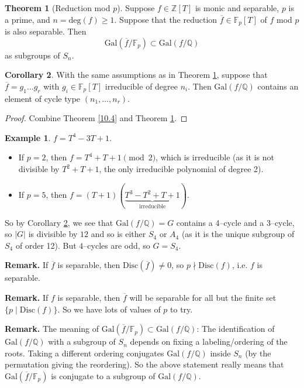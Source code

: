 \documentclass{article}
\theoremstyle{definition}
\newtheorem{theorem}{Theorem}[section]
\newtheorem{cor}[theorem]{Corollary}
\newtheorem{example}{Example}[section]
\begin{document}
\begin{theorem}[Reduction mod $p$]\label{10.5}
    Suppose $f \in \mathbb{Z}[T]$ is monic and separable, $p$ is a prime, and $n = \text{deg}(f)\ge 1$. Suppose that the reduction $\overline{f} \in \mathbb{F}_p[T]$ of $f$ mod $p$ is also separable. Then
    \[
    \text{Gal}(\overline{f}/\mathbb{F}_p) \subset \text{Gal}(f/\mathbb{Q})
    \]
    as subgroups of $S_n$.
\end{theorem}
\begin{cor}\label{10.6}
    With the same assumptions as in Theorem \ref{10.5}, suppose that $\overline{f}=g_1\ldots g_r$ with $g_i \in \mathbb{F}_p[T]$ irreducible of degree $n_i$. Then $\text{Gal}(f/\mathbb{Q})$ contains an element of cycle type $(n_1,\ldots,n_r)$.
\end{cor}
\begin{proof}
    Combine Theorem \ref{10.4} and Theorem \ref{10.5}.
\end{proof}
\begin{example}
    $f = T^4 - 3T + 1$.
    \begin{itemize}
        \item If $p=2$, then $f = T^4+T+1 \pmod{2}$, which is irreducible (as it is not divisible by $T^2+T+1$, the only irreducible polynomial of degree 2).
        \item If $p=5$, then $f=(T+1)(\underbrace{T^3-T^2+T+1}_{\text{irreducible}})$.
    \end{itemize}
    So by Corollary \ref{10.6}, we see that $\text{Gal}(f/\mathbb{Q})=G$ contains a 4--cycle and a 3--cycle, so $|G|$ is divisible by $12$ and so is either $S_4$ or $A_4$ (as it is the unique subgroup of $S_4$ of order 12). But $4$--cycles are odd, so $G = S_4$.
\end{example}
\textbf{Remark.} If $\overline{f}$ is separable, then $\text{Disc}(\overline{f}) \neq 0$, so $p \nmid \text{Disc}(f)$, i.e. $f$ is separable.
\vspace{1mm}


\textbf{Remark.} If $f$ is separable, then $\overline{f}$ will be separable for all but the finite set $\{p \mid \text{Disc}(f)\}$. So we have lots of values of $p$ to try.
\vspace{1mm}


\textbf{Remark.} The meaning of $\text{Gal}(\overline{f}/\mathbb{F}_p) \subset \text{Gal}(f/\mathbb{Q})$: The identification of $\text{Gal}(f/\mathbb{Q})$ with a subgroup of $S_n$ depends on fixing a labeling/ordering of the roots. Taking a different ordering conjugates $\text{Gal}(f/\mathbb{Q})$ inside $S_n$ (by the permutation giving the reordering). So the above statement really means that $\text{Gal}(\overline{f}/\mathbb{F}_p)$ is conjugate to a subgroup of $\text{Gal}(f/\mathbb{Q})$.
\vspace{1mm}
\end{document}
